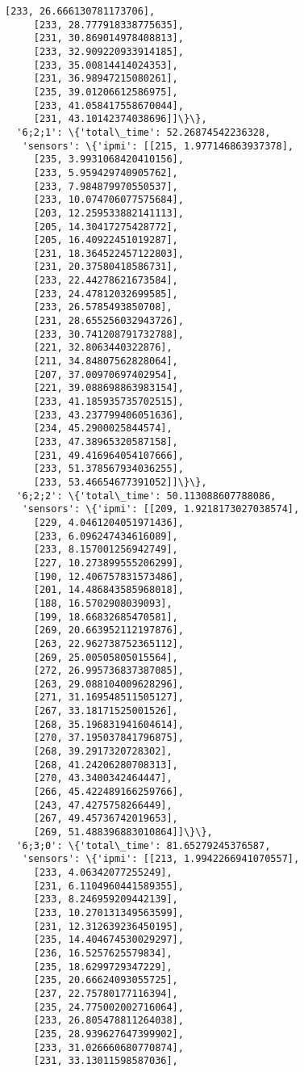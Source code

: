 \documentclass[11pt]{article}
\begin{document}
\begin{tcolorbox}[breakable, size=fbox, boxrule=.5pt, pad at break*=1mm, opacityfill=0]
\begin{Verbatim}[commandchars=\\\{\}]
     [233, 26.666130781173706],
     [233, 28.777918338775635],
     [231, 30.869014978408813],
     [233, 32.909220933914185],
     [233, 35.00814414024353],
     [231, 36.98947215080261],
     [235, 39.01206612586975],
     [233, 41.058417558670044],
     [231, 43.10142374038696]]\}\},
  '6;2;1': \{'total\_time': 52.26874542236328,
   'sensors': \{'ipmi': [[215, 1.977146863937378],
     [235, 3.9931068420410156],
     [233, 5.959429740905762],
     [233, 7.984879970550537],
     [233, 10.074706077575684],
     [203, 12.259533882141113],
     [205, 14.30417275428772],
     [205, 16.40922451019287],
     [231, 18.364522457122803],
     [231, 20.37580418586731],
     [233, 22.44278621673584],
     [233, 24.47812032699585],
     [233, 26.5785493850708],
     [231, 28.655256032943726],
     [233, 30.741208791732788],
     [221, 32.8063440322876],
     [211, 34.84807562828064],
     [207, 37.00970697402954],
     [221, 39.088698863983154],
     [233, 41.185935735702515],
     [233, 43.237799406051636],
     [234, 45.2900025844574],
     [233, 47.38965320587158],
     [231, 49.416964054107666],
     [233, 51.378567934036255],
     [233, 53.46654677391052]]\}\},
  '6;2;2': \{'total\_time': 50.113088607788086,
   'sensors': \{'ipmi': [[209, 1.9218173027038574],
     [229, 4.0461204051971436],
     [233, 6.096247434616089],
     [233, 8.157001256942749],
     [227, 10.273899555206299],
     [190, 12.406757831573486],
     [201, 14.486843585968018],
     [188, 16.5702908039093],
     [199, 18.66832685470581],
     [269, 20.663952112197876],
     [263, 22.962738752365112],
     [269, 25.00505805015564],
     [272, 26.995736837387085],
     [263, 29.088104009628296],
     [271, 31.169548511505127],
     [267, 33.18171525001526],
     [268, 35.196831941604614],
     [270, 37.195037841796875],
     [268, 39.2917320728302],
     [268, 41.24206280708313],
     [270, 43.3400342464447],
     [266, 45.422489166259766],
     [243, 47.4275758266449],
     [267, 49.45736742019653],
     [269, 51.488396883010864]]\}\},
  '6;3;0': \{'total\_time': 81.65279245376587,
   'sensors': \{'ipmi': [[213, 1.9942266941070557],
     [233, 4.06342077255249],
     [231, 6.1104960441589355],
     [233, 8.246959209442139],
     [233, 10.270131349563599],
     [231, 12.312639236450195],
     [235, 14.404674530029297],
     [236, 16.5257625579834],
     [235, 18.6299729347229],
     [235, 20.66624093055725],
     [237, 22.75780177116394],
     [235, 24.775002002716064],
     [233, 26.805478811264038],
     [235, 28.939627647399902],
     [233, 31.026660680770874],
     [231, 33.13011598587036],

\end{Verbatim}
\end{tcolorbox}
\end{document}
